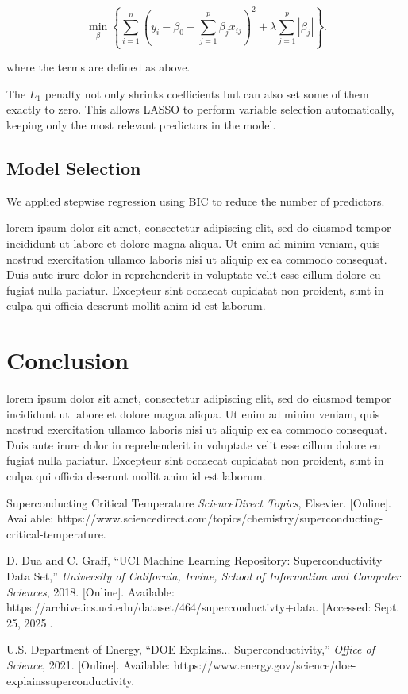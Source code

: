 \documentclass[conference]{IEEEtran}
\begin{document}
\[
\min_{\beta} \left\{ \sum_{i=1}^{n} \left(y_i - \beta_0 - \sum_{j=1}^{p} \beta_j x_{ij}\right)^2 
+ \lambda \sum_{j=1}^{p} |\beta_j| \right\}.
\]

where the terms are defined as above.

The $L_1$ penalty not only shrinks coefficients but can also set some of them exactly to zero. This allows LASSO to perform variable selection automatically, keeping only the most relevant predictors in the model.


\subsection{Model Selection}
We applied stepwise regression using BIC to reduce the number of predictors.

lorem ipsum dolor sit amet, consectetur adipiscing elit, sed do eiusmod tempor incididunt ut labore et dolore magna aliqua. Ut enim ad minim veniam, quis nostrud exercitation ullamco laboris nisi ut aliquip ex ea commodo consequat. Duis aute irure dolor in reprehenderit in voluptate velit esse cillum dolore eu fugiat nulla pariatur. Excepteur sint occaecat cupidatat non proident, sunt in culpa qui officia deserunt mollit anim id est laborum.
\section{Conclusion}
lorem ipsum dolor sit amet, consectetur adipiscing elit, sed do eiusmod tempor incididunt ut labore et dolore magna aliqua. Ut enim ad minim veniam, quis nostrud exercitation ullamco laboris nisi ut aliquip ex ea commodo consequat. Duis aute irure dolor in reprehenderit in voluptate velit esse cillum dolore eu fugiat nulla pariatur. Excepteur sint occaecat cupidatat non proident, sunt in culpa qui officia deserunt mollit anim id est laborum.
\begin{thebibliography}{00}

Superconducting Critical Temperature \emph{ScienceDirect Topics}, Elsevier. [Online]. 
Available: https://www.sciencedirect.com/topics/chemistry/superconducting-critical-temperature. 

D. Dua and C. Graff, ``UCI Machine Learning Repository: Superconductivity Data Set,'' 
\emph{University of California, Irvine, School of Information and Computer Sciences}, 2018. 
[Online]. Available: https://archive.ics.uci.edu/dataset/464/superconductivty+data. 
[Accessed: Sept. 25, 2025].

U.S. Department of Energy, ``DOE Explains... Superconductivity,'' 
\emph{Office of Science}, 2021. [Online]. 
Available: https://www.energy.gov/science/doe-explainssuperconductivity.

\end{thebibliography}
\end{document}
